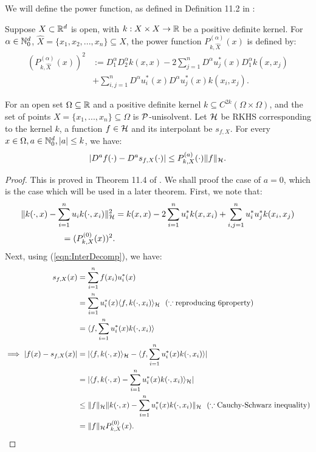 \documentclass[twoside]{memoir}
\begin{document}
We will define the power function, as defined in Definition 11.2 in \cite{ScatteredDataApproximation}:
\begin{defn}
	Suppose $X \subset \mathbb{R}^d$ is open, with $k: X \times X \rightarrow \mathbb{R}$ be a positive definite kernel. For $\alpha \in \mathbb{N}_0^d$, $\hat{X} = \{x_1, x_2, ..., x_n\} \subseteq X$, the power function $P^{(\alpha)}_{k,\hat{X}}(x)$ is defined by:
	\begin{equation*}
	\begin{split}
	(P^{(\alpha)}_{k,\hat{X}}(x))^2 &:= D_1^\alpha D_2^\alpha k(x, x) 
	- 2 \sum_{j=1}^n D^{\alpha}u_j^*(x)D_1^\alpha k(x, x_j) \\
	&+ \sum_{i,j = 1}^{n} D^\alpha u_i^*(x) D^\alpha u_j^*(x) k(x_i, x_j).
	\end{split}
	\end{equation*}
\end{defn}
\begin{thm}\label{thm:PowerBound}
	For an open set $\Omega \subseteq \mathbb{R}$ and a positive definite kernel $k \subseteq C^{2k}(\Omega \times \Omega)$, and the set of points $X = \{x_1,..., x_n\} \subseteq \Omega$ is $\mathcal{P}$-unisolvent. Let $\mathcal{H}$ be RKHS corresponding to the kernel $k$, a function $f \in \mathcal{H}$ and its interpolant be $s_{f,X}$. For every $x \in \Omega, a \in \mathbb{N}_0^d, |a| \leq k$, we have:
	\begin{equation}
	|D^af(\cdot) - D^as_{f,X}(\cdot)| \leq P^{(a)}_{k,X}(\cdot) \lVert f\rVert_{\mathcal{H}}.
	\end{equation}
\end{thm}
\begin{proof}
	This is proved in Theorem 11.4 of \cite{ScatteredDataApproximation}. We shall proof the case of $a = 0$, which is the case which will be used in a later theorem.
	First, we note that:
	\begin{equation*}
	\begin{split}
	\lVert k(\cdot,x) - \sum_{i=1}^{n}u_ik(\cdot, x_i)\rVert^2_{\mathcal{H}} &= k(x,x) - 2\sum_{i=1}^{n}u^*_ik(x,x_i) + \sum_{i,j=1}^{n}u^*_iu^*_jk(x_i,x_j) \\
	= (P^{(0)}_{k,X}(x))^2.
	\end{split}
	\end{equation*}
	Next, using (\ref{eqn:InterDecomp}), we have:
	\begin{equation*}
	\begin{split}
	s_{f,X}(x) &= \sum_{i=1}^{n} f(x_i) u_i^*(x) \\
	&= \sum_{i=1}^{n} u_i^*(x) \langle f, k(\cdot, x_i)\rangle_{\mathcal{H}} ~~ (\because \text{reproducing 6property}) \\
	&= \langle f, \sum_{i=1}^{n}u_i^*(x) k(\cdot, x_i)\rangle \\
	\implies |f(x) - s_{f,X}(x)| &= | \langle f, k(\cdot, x)\rangle_{\mathcal{H}} -  \langle f, \sum_{i=1}^{n}u_i^*(x) k(\cdot, x_i)\rangle | \\
	&= |\langle f,  k(\cdot, x) - \sum_{i=1}^{n}u_i^*(x) k(\cdot, x_i)\rangle_{\mathcal{H}}| \\
	&\leq \lVert f\rVert_{\mathcal{H}} \lVert k(\cdot, x) - \sum_{i=1}^{n}u_i^*(x) k(\cdot, x_i)\rVert_{\mathcal{H}} ~~ (\because \text{Cauchy-Schwarz inequality}) \\
	&= \lVert f\rVert_{\mathcal{H}} P^{(0)}_{k,X}(x).
	\end{split}
	\end{equation*}
\end{proof}
\end{document}
